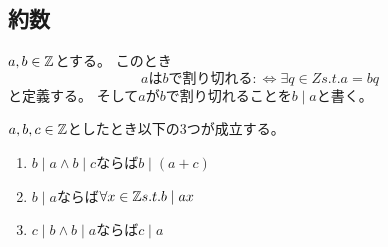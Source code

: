 \documentclass[uplatex, 11pt, a4j, dvipdfmx]{jsarticle}
\begin{document}
  \subsection{約数}
    \begin{screen} \begin{dfn}
      $a, b \in \mathbb{Z}$とする。
      このとき
      \begin{equation}
        \text{$a$は$b$で割り切れる} :\Leftrightarrow \exists q \in Z s.t. a = bq
      \end{equation}
      と定義する。
      そして$a$が$b$で割り切れることを$b \mid a$と書く。
    \end{dfn} \end{screen}
    \begin{screen} \begin{prop}
      $a, b, c \in \mathbb{Z}$としたとき以下の3つが成立する。
      \begin{enumerate}
        \item $b \mid a \land b \mid c$ならば$b \mid (a + c)$
        \item $b \mid a$ならば$\forall x \in \mathbb{Z} s.t. b \mid ax$
        \item $c \mid b \land b \mid a$ならば$c \mid a$
      \end{enumerate}
    \end{prop} \end{screen}



\end{document}
